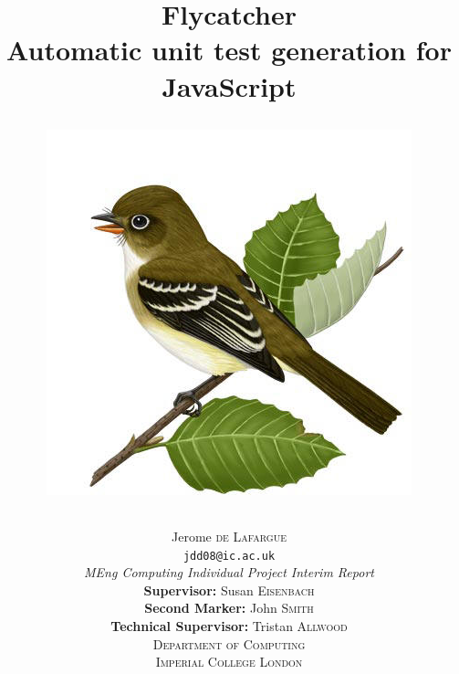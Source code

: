 \documentclass[a4paper,11pt,titlepage]{report}
\begin{document}
	
	\title
	{
		{\Huge \textbf{Flycatcher} \\[0.2cm]}
		{Automatic unit test generation for JavaScript\\[0.5cm]}
		\begin{figure}[h]
			\centering
			\includegraphics[scale=0.4]{flycatcher.jpg}
		\end{figure}
	}
	\author
	{	
		{\large Jerome \textsc{de Lafargue}}\\
		\texttt{\scriptsize jdd08@ic.ac.uk}\\[4cm]
		{\emph{MEng Computing Individual Project Interim Report}}\\[1.2cm]
		\textbf{\small Supervisor:}
		{\small Susan \textsc{Eisenbach}}\\
		\textbf{\small Second Marker:}
		{\small John \textsc{Smith}}\\
		\textbf{\small Technical Supervisor:}
		{\small Tristan \textsc{Allwood}}\\[0.5cm]
		\textsc{\scriptsize Department of Computing}\\
		\textsc{\small Imperial College London}
	}

	
	\date{}
	\maketitle

\tableofcontents
\end{document}
